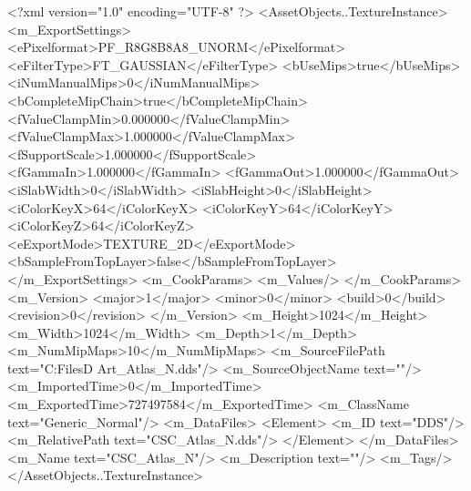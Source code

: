 <?xml version="1.0" encoding="UTF-8" ?>
<AssetObjects..TextureInstance>
	<m_ExportSettings>
		<ePixelformat>PF_R8G8B8A8_UNORM</ePixelformat>
		<eFilterType>FT_GAUSSIAN</eFilterType>
		<bUseMips>true</bUseMips>
		<iNumManualMips>0</iNumManualMips>
		<bCompleteMipChain>true</bCompleteMipChain>
		<fValueClampMin>0.000000</fValueClampMin>
		<fValueClampMax>1.000000</fValueClampMax>
		<fSupportScale>1.000000</fSupportScale>
		<fGammaIn>1.000000</fGammaIn>
		<fGammaOut>1.000000</fGammaOut>
		<iSlabWidth>0</iSlabWidth>
		<iSlabHeight>0</iSlabHeight>
		<iColorKeyX>64</iColorKeyX>
		<iColorKeyY>64</iColorKeyY>
		<iColorKeyZ>64</iColorKeyZ>
		<eExportMode>TEXTURE_2D</eExportMode>
		<bSampleFromTopLayer>false</bSampleFromTopLayer>
	</m_ExportSettings>
	<m_CookParams>
		<m_Values/>
	</m_CookParams>
	<m_Version>
		<major>1</major>
		<minor>0</minor>
		<build>0</build>
		<revision>0</revision>
	</m_Version>
	<m_Height>1024</m_Height>
	<m_Width>1024</m_Width>
	<m_Depth>1</m_Depth>
	<m_NumMipMaps>10</m_NumMipMaps>
	<m_SourceFilePath text="C:\Users\Shadow\Desktop\Working Files\3D Art\Textures\CSC_Atlas_N.dds"/>
	<m_SourceObjectName text=""/>
	<m_ImportedTime>0</m_ImportedTime>
	<m_ExportedTime>727497584</m_ExportedTime>
	<m_ClassName text="Generic_Normal"/>
	<m_DataFiles>
		<Element>
			<m_ID text="DDS"/>
			<m_RelativePath text="CSC_Atlas_N.dds"/>
		</Element>
	</m_DataFiles>
	<m_Name text="CSC_Atlas_N"/>
	<m_Description text=""/>
	<m_Tags/>
</AssetObjects..TextureInstance>

